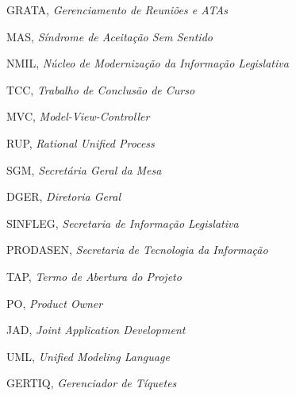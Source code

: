 \begin{siglas}
	\item GRATA, \textit{Gerenciamento de Reuniões e ATAs}
  	\item MAS, \textit{Síndrome de Aceitação Sem Sentido}
  	\item NMIL, \textit{Núcleo de Modernização da Informação Legislativa}
  	\item TCC, \textit{Trabalho de Conclusão de Curso}
  	\item MVC, \textit{Model-View-Controller}
  	\item RUP, \textit{Rational Unified Process}
  	\item SGM, \textit{Secretária Geral da Mesa}
  	\item DGER, \textit{Diretoria Geral}
  	\item SINFLEG, \textit{Secretaria de Informação Legislativa}
  	\item PRODASEN, \textit{Secretaria de Tecnologia da Informação}
  	\item TAP, \textit{Termo de Abertura do Projeto}
  	\item PO, \textit{Product Owner}
  	\item JAD, \textit{Joint Application Development}
  	\item UML, \textit{Unified Modeling Language}
  	\item GERTIQ, \textit{Gerenciador de Tíquetes}
\end{siglas}